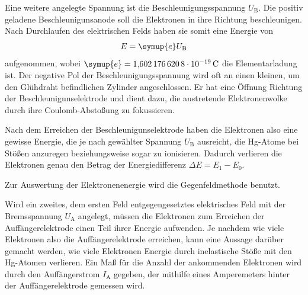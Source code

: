 Eine weitere angelegte Spannung ist die Beschleunigungsspannung $U_\text{B}$. 
Die positiv geladene Beschleunigunsanode soll die Elektronen in ihre Richtung beschleunigen.
Nach Durchlaufen des elektrischen Felds haben sie somit eine Energie von 
\begin{equation*}
    E=\symup{e}U_\text{B}
\end{equation*}
aufgenommen, wobei $\symup{e}=\SI{1.6021766208e-19}{\coulomb}$ die Elementarladung ist\cite{scipy}. 
Der negative Pol der Beschleunigungsspannung wird oft an einen kleinen, um den Glühdraht befindlichen Zylinder angeschlossen. 
Er hat eine Öffnung Richtung der Beschleunigunselektrode und dient dazu, die austretende Elektronenwolke durch ihre 
Coulomb-Abstoßung zu fokussieren.

Nach dem Erreichen der Beschleunigunselektrode haben die Elektronen also eine gewisse Energie, die je nach gewählter Spannung $U_\text{B}$
ausreicht, die Hg-Atome bei Stößen anzuregen beziehungsweise sogar zu ionisieren. Dadurch verlieren die Elektronen 
genau den Betrag der Energiedifferenz $\Delta E=E_1-E_0$.

Zur Auswertung der Elektronenenergie wird die Gegenfeldmethode benutzt. 

Wird ein zweites, dem ersten Feld entgegengesetztes elektrisches Feld mit der Bremsspannung $U_\text{A}$ angelegt, müssen die 
Elektronen zum Erreichen der Auffängerelektrode einen Teil ihrer Energie aufwenden. 
Je nachdem wie viele Elektronen also die Auffängerelektrode erreichen, kann eine Aussage darüber gemacht werden, 
wie viele Elektronen Energie durch inelastische Stöße mit den Hg-Atomen verlieren. 
Ein Maß für die Anzahl der ankommenden Elektronen wird durch den Auffängerstrom $I_\text{A}$ gegeben, der mithilfe eines 
Amperemeters hinter der Auffängerelektrode gemessen wird. 


